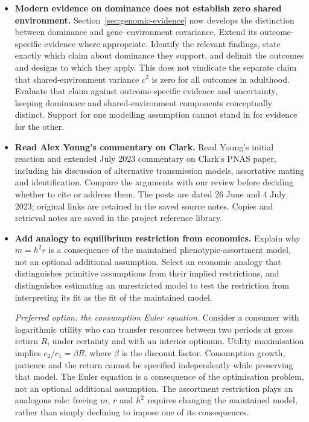 \begin{itemize}
\item \textbf{Modern evidence on dominance does not establish zero shared environment.}
Section~\ref{sec:genomic-evidence} now develops the distinction between
dominance and gene--environment covariance. Extend its outcome-specific
evidence where appropriate. Identify the relevant findings,
state exactly which claim about dominance they support, and delimit
the outcomes and designs to which they apply. This does not vindicate
the separate claim that shared-environment variance $c^2$ is zero for
all outcomes in adulthood. Evaluate that claim against outcome-specific
evidence and uncertainty, keeping dominance and shared-environment
components conceptually distinct. Support for one modelling assumption
cannot stand in for evidence for the other.
\item \textbf{Read Alex Young's commentary on Clark.}
Read Young's initial reaction and extended July 2023 commentary on
Clark's PNAS paper, including his discussion of alternative transmission
models, assortative mating and identification. Compare the arguments
with our review before deciding whether to cite or address them.
The posts are dated 26 June and 4 July 2023; original links are retained
in the saved source notes.
Copies and retrieval notes are saved in the project reference library.

\item \textbf{Add analogy to equilibrium restriction from economics.}
Explain why $m=h^2r$ is a consequence of the maintained phenotypic-assortment
model, not an optional additional assumption. Select an economic analogy
that distinguishes primitive assumptions from their implied restrictions,
and distinguishes estimating an unrestricted model to test the restriction
from interpreting its fit as the fit of the maintained model.


\par\medskip
\textit{Preferred option: the consumption Euler equation.}
Consider a consumer with logarithmic utility who can transfer resources
between two periods at gross return $R$, under certainty and with an
interior optimum. Utility maximisation implies $c_2/c_1=\beta R$, where
$\beta$ is the discount factor. Consumption growth, patience and the
return cannot be specified independently while preserving that model.
The Euler equation is a consequence of the optimisation problem, not
an optional additional assumption. The assortment restriction plays an
analogous role: freeing $m$, $r$ and $h^2$ requires changing the maintained
model, rather than simply declining to impose one of its consequences.


\end{itemize}
